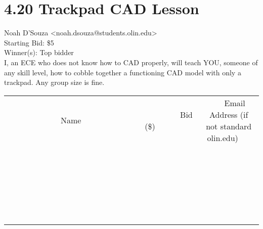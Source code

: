 \documentclass[11pt]{article}
\begin{document}
					\section*{4.20 Trackpad CAD Lesson}
					Noah D'Souza <noah.dsouza@students.olin.edu> \\
					Starting Bid: \$5 \\
					Winner(s): Top bidder \\
					I, an ECE who does not know how to CAD properly, will teach YOU, someone of any skill level, how to cobble together a functioning CAD model with only a trackpad. Any group size is fine. \\
					[6ex]
					\begin{tabular}{c c c}
						~~~~~~~~~~~~~Name~~~~~~~~~~~~~ & ~~~~~~~~~Bid (\$)~~~~~~~~~ & ~~~Email Address (if not standard olin.edu)~~~ \\
				
 & & \\
\hline
 & & \\
\hline
 & & \\
\hline
 & & \\
\hline
 & & \\
\hline
 & & \\
\hline
 & & \\
\hline
 & & \\
\hline
 & & \\
\hline
 & & \\
\hline
 & & \\
\hline
 & & \\
\hline
 & & \\
\hline
 & & \\
\hline
 & & \\
\hline
 & & \\
\hline
 & & \\
\hline
 & & \\
\hline
 & & \\
\hline
 & & \\
\hline
 & & \\
\hline
 & & \\
\hline
 & & \\
\hline
 & & \\
\hline
 & & \\
\hline
 & & \\
\hline
					\end{tabular}
					\clearpage
				
\end{document}
